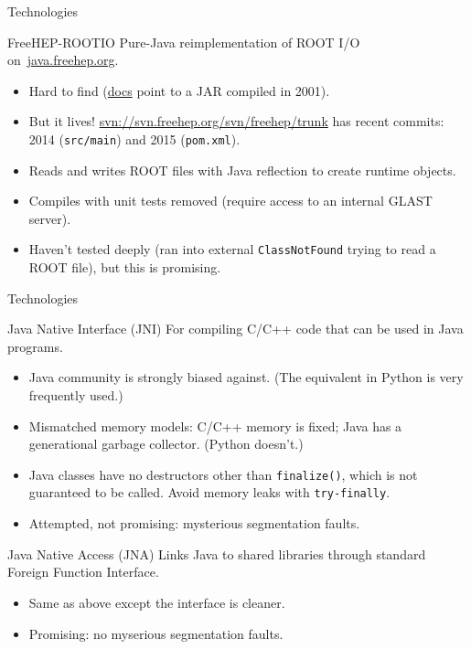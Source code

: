 \documentclass{beamer}
\begin{document}
\begin{frame}{Technologies}

\begin{block}{FreeHEP-ROOTIO}
Pure-Java reimplementation of ROOT I/O \mbox{on \url{java.freehep.org}.\hspace{-1 cm}}
\begin{itemize}
\item Hard to find (\href{http://java.freehep.org/freehep-rootio/}{docs} point to a JAR compiled in 2001).
\item But it lives! \url{svn://svn.freehep.org/svn/freehep/trunk} has recent commits: 2014 ({\tt src/main}) and 2015 ({\tt pom.xml}).
\item Reads and writes ROOT files with Java reflection to create runtime objects.
\item Compiles with unit tests removed (require access to an internal GLAST server).
\item Haven't tested deeply (ran into external {\tt ClassNotFound} trying to read a ROOT file), but this is promising.
\end{itemize}
\end{block}
\end{frame}

\begin{frame}{Technologies}
\begin{block}{Java Native Interface (JNI)}
For compiling C/C++ code that can be used in Java programs.
\begin{itemize}
\item Java community is strongly biased against. (The equivalent in Python is very frequently used.)
\item Mismatched memory models: C/C++ memory is fixed; Java has a generational garbage collector. (Python doesn't.)
\item Java classes have no destructors other than {\tt finalize()}, which is not guaranteed to be called. Avoid memory leaks with {\tt try-finally}.
\item Attempted, not promising: mysterious segmentation faults.
\end{itemize}
\end{block}

\begin{block}{Java Native Access (JNA)}
Links Java to shared libraries through standard Foreign Function Interface.
\begin{itemize}
\item Same as above except the interface is cleaner.
\item Promising: no myserious segmentation faults.
\end{itemize}
\end{block}
\end{frame}
\end{document}
